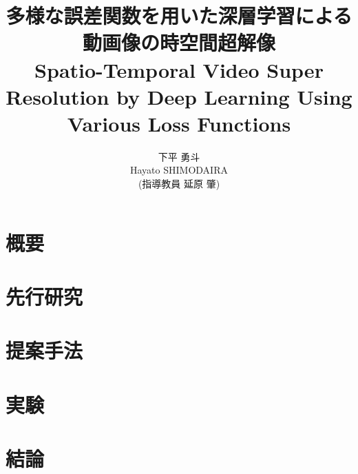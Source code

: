 \documentclass[twocolumn,a4j,uplatex]{jsarticle}
\title{{\Large 多様な誤差関数を用いた深層学習による動画像の時空間超解像} \\
Spatio-Temporal Video Super Resolution by Deep Learning Using Various Loss Functions}
\author{{\Large 下平 勇斗} \\ Hayato SHIMODAIRA \\ (指導教員 延原 肇)}
\begin{document}
\maketitle
\thispagestyle{headings}
\section{概要}
\section{先行研究}
\section{提案手法}
\section{実験}
\section{結論}

\begin{thebibliography}{99}

\end{thebibliography}
\end{document}
